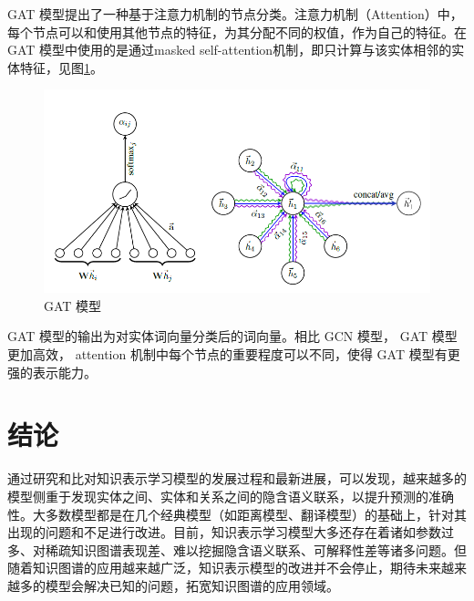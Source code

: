 \documentclass{llncs}
\begin{document}
GAT 模型\cite{DBLP:conf/iclr/VelickovicCCRLB18}提出了一种基于注意力机制的节点分类。注意力机制（Attention）\cite{DBLP:journals/corr/BahdanauCB14}中，每个节点可以和使用其他节点的特征，为其分配不同的权值，作为自己的特征。在 GAT 模型中使用的是通过masked self-attention机制，即只计算与该实体相邻的实体特征，见图\ref{fg:GAT}。
\begin{figure}
	\centering
	\includegraphics[width=0.8\columnwidth]{figures/GAT.png}
	\caption{ GAT 模型}
	\label{fg:GAT}
\end{figure}
 GAT 模型的输出为对实体词向量分类后的词向量。相比 GCN 模型\cite{DBLP:conf/iclr/KipfW17,DBLP:conf/nips/DefferrardBV16}， GAT 模型更加高效， attention 机制中每个节点的重要程度可以不同，使得 GAT 模型有更强的表示能力。

\section{结论}

通过研究和比对知识表示学习模型的发展过程和最新进展，可以发现，越来越多的模型侧重于发现实体之间、实体和关系之间的隐含语义联系，以提升预测的准确性。大多数模型都是在几个经典模型（如距离模型、翻译模型）的基础上，针对其出现的问题和不足进行改进。目前，知识表示学习模型大多还存在着诸如参数过多、对稀疏知识图谱表现差、难以挖掘隐含语义联系、可解释性差等诸多问题。但随着知识图谱的应用越来越广泛，知识表示模型的改进并不会停止，期待未来越来越多的模型会解决已知的问题，拓宽知识图谱的应用领域。


%

	
\end{document}
